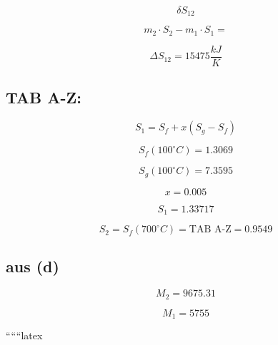\begin{equation*}
    \delta S_{12}
\end{equation*}

\begin{equation*}
    m_2 \cdot S_2 - m_1 \cdot S_1 =
\end{equation*}

\begin{equation*}
    \Delta S_{12} = 15475 \frac{kJ}{K}
\end{equation*}

\subsection*{TAB A-Z:}

\begin{equation*}
    S_1 = S_f + x (S_g - S_f)
\end{equation*}

\begin{equation*}
    S_f (100^\circ C) = 1.3069
\end{equation*}

\begin{equation*}
    S_g (100^\circ C) = 7.3595
\end{equation*}

\begin{equation*}
    x = 0.005
\end{equation*}

\begin{equation*}
    S_1 = 1.33717
\end{equation*}

\begin{equation*}
    S_2 = S_f (700^\circ C) = \text{TAB A-Z} = 0.9549
\end{equation*}

\subsection*{aus (d)}

\begin{equation*}
    M_2 = 9675.31
\end{equation*}

\begin{equation*}
    M_1 = 5755
\end{equation*}

``````latex


